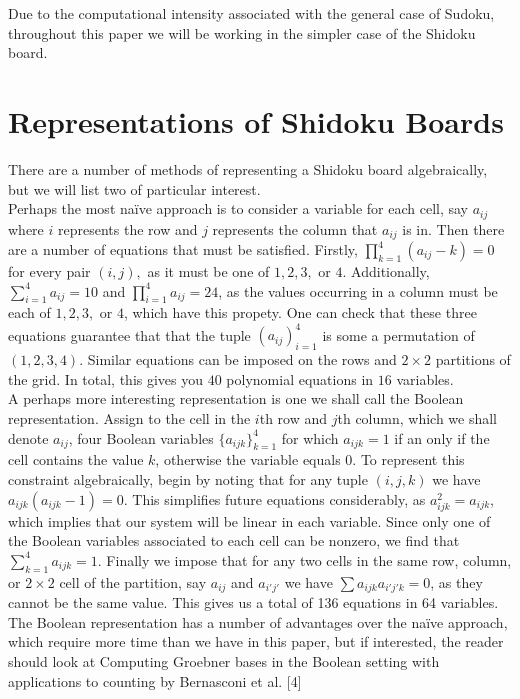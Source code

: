 \documentclass[12pt]{amsart}
\begin{document}
Due to the computational intensity associated with the general case of Sudoku, throughout this paper we will be working in the simpler case of the Shidoku board.

\section{Representations of Shidoku Boards}

There are a number of methods of representing a Shidoku board algebraically, but we will list two of particular interest.\\

Perhaps the most na\" ive approach is to consider a variable for each cell, say $a_{ij}$ where $i$ represents the row and $j$ represents the column that $a_{ij}$ is in. Then there are a number of equations that must be satisfied. Firstly, $\prod_{k=1}^4 (a_{ij} - k) = 0$ for every pair $(i,j),$ as it must be one of $1,2,3,$ or $4.$ Additionally, $\sum_{i=1}^4 a_{ij} = 10$ and $\prod_{i=1}^4 a_{ij} = 24$, as the values occurring in a column must be each of  $1,2,3,$ or $4$, which have this propety. One can check that these three equations guarantee that that the tuple $(a_{ij})_{i=1}^4$ is some a permutation of $(1,2,3,4)$. Similar equations can be imposed on the rows and $2\times 2$ partitions of the grid. In total, this gives you $40$ polynomial equations in $16$ variables.\\

A perhaps more interesting representation is one we shall call the Boolean representation. Assign to the cell in the $i$th row and $j$th column, which we shall denote $a_{ij}$, four Boolean variables $\{a_{ijk}\}_{k=1}^4$ for which $a_{ijk} = 1$ if an only if the cell contains the value $k$, otherwise the variable equals $0$. To represent this constraint algebraically, begin by noting that for any tuple $(i,j,k)$ we have $a_{ijk}(a_{ijk}-1) = 0$. This simplifies future equations considerably, as $a_{ijk}^2 = a_{ijk}$, which implies that our system will be linear in each variable. Since only one of the Boolean variables associated to each cell can be nonzero, we find that $\sum_{k=1}^4 a_{ijk} = 1$. Finally we impose that for any two cells in the same row, column, or $2\times 2$ cell of the partition, say $a_{ij}$ and $a_{i'j'}$ we have $\sum a_{ijk}a_{i'j'k} = 0$, as they cannot be the same value. This gives us a total of 136 equations in 64 variables.\\

The Boolean representation has a number of advantages over the na\" ive approach, which require more time than we have in this paper, but if interested, the reader should look at Computing Groebner bases in the Boolean setting with applications to counting by Bernasconi et al. [4]
\end{document}
